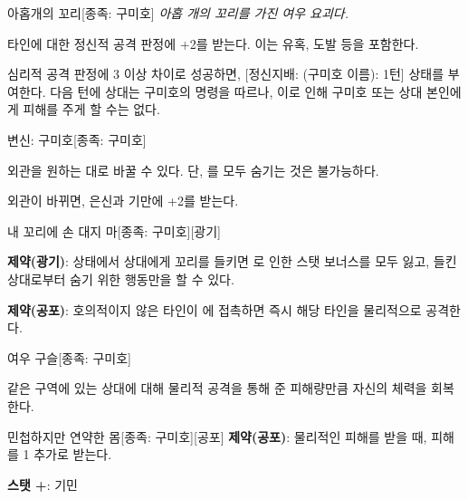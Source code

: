 \documentclass{report}
\begin{document}
	\begin{story}{아홉개의 꼬리}{[종족: 구미호]}
		\textit{아홉 개의 꼬리를 가진 여우 요괴다.}
		
		
		타인에 대한 정신적 공격 판정에 +2를 받는다. 이는 유혹, 도발 등을 포함한다.
		
		심리적 공격 판정에 3 이상 차이로 성공하면, [정신지배: (구미호 이름): 1턴] 상태를 부여한다. 다음 턴에 상대는 구미호의 명령을 따르나, 이로 인해 구미호 또는 상대 본인에게 피해를 주게 할 수는 없다.
		
	\end{story}
	
	\begin{story}{변신: 구미호}{[종족: 구미호]}
		
		외관을 원하는 대로 바꿀 수 있다. 단, 를 모두 숨기는 것은 불가능하다.
		
		외관이 바뀌면, 은신과 기만에 +2를 받는다.
		
	\end{story}
	
	\begin{story}{내 꼬리에 손 대지 마}{[종족: 구미호][광기]}
		
		\textbf{제약(광기)}:  상태에서 상대에게 꼬리를 들키면 로 인한 스탯 보너스를 모두 잃고, 들킨 상대로부터 숨기 위한 행동만을 할 수 있다.
		
		\smallskip
		
		\textbf{제약(공포)}: 호의적이지 않은 타인이 에 접촉하면 즉시 해당 타인을 물리적으로 공격한다.
		
	\end{story}
	
	\begin{story}{여우 구슬}{[종족: 구미호]}
		
		같은 구역에 있는 상대에 대해 물리적 공격을 통해 준 피해량만큼 자신의 체력을 회복한다.
		
	\end{story}
	
	\begin{story}{민첩하지만 연약한 몸}{[종족: 구미호][공포]}
		\textbf{제약(공포)}: 물리적인 피해를 받을 때, 피해를 1 추가로 받는다.
		
		\smallskip
		
		\textbf{스탯 +}: 기민
		
	\end{story}
	
\end{document}
